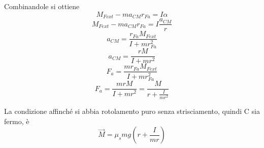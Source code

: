 \documentclass[twoside]{article}
\begin{document}
Combinandole si ottiene
\begin{equation*}
  \displaystyle {M}_{Fext} - m a_{CM} r_{Fa} = I \alpha
\end{equation*}
\begin{equation*}
  \displaystyle {M}_{Fext} - m a_{CM} r_{Fa} = I \frac{a_{CM}}{r}
\end{equation*}
\begin{equation*}
  \displaystyle a_{CM} = \frac{r_{Fa} M_{Fext}}{I + m r_{Fa}^2}
\end{equation*}
\begin{equation}
  \displaystyle \boxed{a_{CM} = \frac{r M}{I + m r^2}}
\end{equation}
\begin{equation*}
  \displaystyle F_{a} = \frac{m r_{Fa} M_{Fext}}{I + m r_{Fa}^2}
\end{equation*}
\begin{equation}
  \boxed{F_{a} = \frac{m r M}{I + m r^2} = \frac{M}{ r + \frac{I}{m r^2}}}
\end{equation}


La condizione affinché si abbia rotolamento puro senza strisciamento, quindi C sia fermo, è
\begin{equation}
  \boxed{\vec{M} = \mu_s mg (r + \frac{I}{mr})}
\end{equation}
\end{document}
